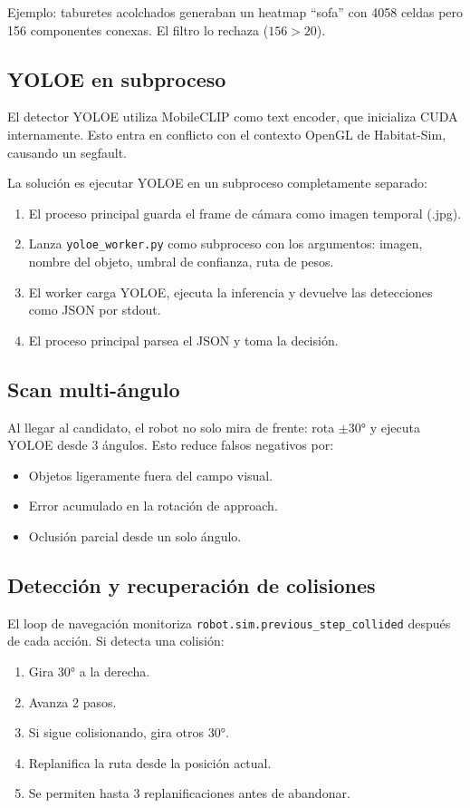 \documentclass[11pt,a4paper]{article}
\begin{document}
Ejemplo: taburetes acolchados generaban un heatmap ``sofa'' con 4058 celdas pero 156 componentes conexas. El filtro lo rechaza ($156 > 20$).

\subsection{YOLOE en subproceso}

El detector YOLOE utiliza MobileCLIP como text encoder, que inicializa CUDA internamente. Esto entra en conflicto con el contexto OpenGL de Habitat-Sim, causando un segfault.

La solución es ejecutar YOLOE en un subproceso completamente separado:
\begin{enumerate}
    \item El proceso principal guarda el frame de cámara como imagen temporal (.jpg).
    \item Lanza \texttt{yoloe\_worker.py} como subproceso con los argumentos: imagen, nombre del objeto, umbral de confianza, ruta de pesos.
    \item El worker carga YOLOE, ejecuta la inferencia y devuelve las detecciones como JSON por stdout.
    \item El proceso principal parsea el JSON y toma la decisión.
\end{enumerate}

\subsection{Scan multi-ángulo}

Al llegar al candidato, el robot no solo mira de frente: rota $\pm$30° y ejecuta YOLOE desde 3 ángulos. Esto reduce falsos negativos por:
\begin{itemize}
    \item Objetos ligeramente fuera del campo visual.
    \item Error acumulado en la rotación de approach.
    \item Oclusión parcial desde un solo ángulo.
\end{itemize}

\subsection{Detección y recuperación de colisiones}

El loop de navegación monitoriza \texttt{robot.sim.previous\_step\_collided} después de cada acción. Si detecta una colisión:
\begin{enumerate}
    \item Gira 30° a la derecha.
    \item Avanza 2 pasos.
    \item Si sigue colisionando, gira otros 30°.
    \item Replanifica la ruta desde la posición actual.
    \item Se permiten hasta 3 replanificaciones antes de abandonar.
\end{enumerate}
\end{document}
